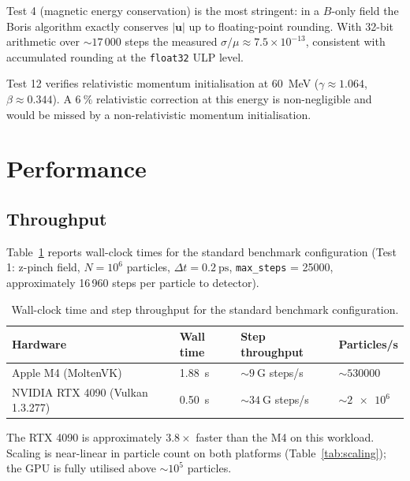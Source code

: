 \documentclass[review,12pt]{elsarticle}
\begin{document}
Test 4 (magnetic energy conservation) is the most stringent: in a $B$-only field the
Boris algorithm exactly conserves $|\mathbf{u}|$ up to floating-point rounding.
With 32-bit arithmetic over $\sim 17\,000$ steps the measured $\sigma/\mu \approx 7.5 \times 10^{-13}$,
consistent with accumulated rounding at the \texttt{float32} ULP level.

Test 12 verifies relativistic momentum initialisation at \SI{60}{\MeV} ($\gamma \approx 1.064$,
$\beta \approx 0.344$). A $\SI{6}{\%}$ relativistic correction at this energy is non-negligible
and would be missed by a non-relativistic momentum initialisation.

\section{Performance}
\label{sec:performance}

\subsection{Throughput}

Table~\ref{tab:perf} reports wall-clock times for the standard benchmark configuration
(Test 1: z-pinch field, $N = 10^6$ particles, $\Delta t = \SI{0.2}{\pico\second}$,
\texttt{max\_steps} = 25000, approximately 16\,960 steps per particle to detector).

\begin{table}[h!]
\centering
\caption{Wall-clock time and step throughput for the standard benchmark configuration.}
\label{tab:perf}
\begin{tabular}{llll}
\toprule
Hardware & Wall time & Step throughput & Particles/s \\
\midrule
Apple M4 (MoltenVK) & \SI{1.88}{\second} & $\sim\SI{9}{\giga{}}$ steps/s & $\sim\SI{530000}{}$ \\
NVIDIA RTX 4090 (Vulkan 1.3.277) & \SI{0.50}{\second} & $\sim\SI{34}{\giga{}}$ steps/s & $\sim\SI{2e6}{}$ \\
\bottomrule
\end{tabular}
\end{table}

The RTX 4090 is approximately $3.8\times$ faster than the M4 on this workload.
Scaling is near-linear in particle count on both platforms (Table~\ref{tab:scaling});
the GPU is fully utilised above $\sim 10^5$ particles.
\end{document}
